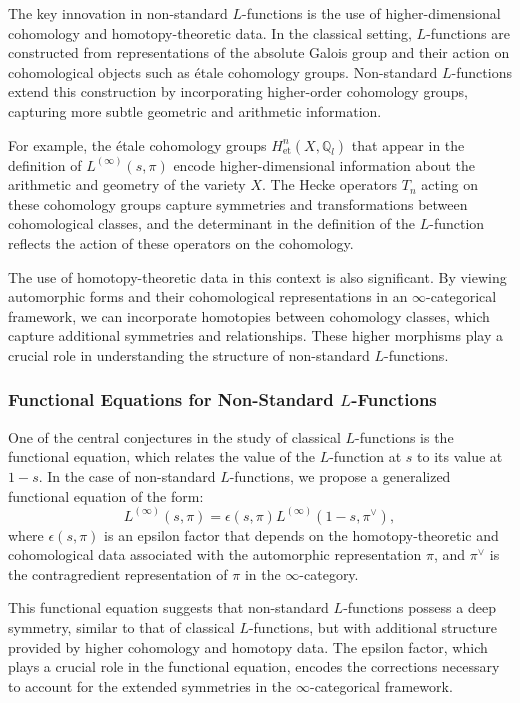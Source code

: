 \documentclass{article}
\theoremstyle{remark}
\begin{document}
The key innovation in non-standard $L$-functions is the use of higher-dimensional cohomology and homotopy-theoretic data. In the classical setting, $L$-functions are constructed from representations of the absolute Galois group and their action on cohomological objects such as étale cohomology groups. Non-standard $L$-functions extend this construction by incorporating higher-order cohomology groups, capturing more subtle geometric and arithmetic information.

For example, the étale cohomology groups $H^n_{\text{et}}(X, \mathbb{Q}_l)$ that appear in the definition of $L^{(\infty)}(s, \pi)$ encode higher-dimensional information about the arithmetic and geometry of the variety $X$. The Hecke operators $T_n$ acting on these cohomology groups capture symmetries and transformations between cohomological classes, and the determinant in the definition of the $L$-function reflects the action of these operators on the cohomology.

The use of homotopy-theoretic data in this context is also significant. By viewing automorphic forms and their cohomological representations in an $\infty$-categorical framework, we can incorporate homotopies between cohomology classes, which capture additional symmetries and relationships. These higher morphisms play a crucial role in understanding the structure of non-standard $L$-functions.

\subsubsection{Functional Equations for Non-Standard $L$-Functions}

One of the central conjectures in the study of classical $L$-functions is the functional equation, which relates the value of the $L$-function at $s$ to its value at $1 - s$. In the case of non-standard $L$-functions, we propose a generalized functional equation of the form:
\[
L^{(\infty)}(s, \pi) = \epsilon(s, \pi) L^{(\infty)}(1-s, \pi^\vee),
\]
where $\epsilon(s, \pi)$ is an epsilon factor that depends on the homotopy-theoretic and cohomological data associated with the automorphic representation $\pi$, and $\pi^\vee$ is the contragredient representation of $\pi$ in the $\infty$-category.

This functional equation suggests that non-standard $L$-functions possess a deep symmetry, similar to that of classical $L$-functions, but with additional structure provided by higher cohomology and homotopy data. The epsilon factor, which plays a crucial role in the functional equation, encodes the corrections necessary to account for the extended symmetries in the $\infty$-categorical framework.
\end{document}
